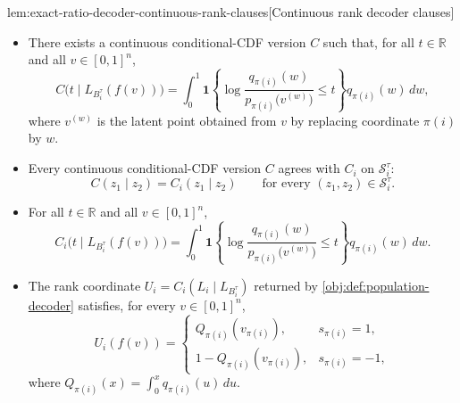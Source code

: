 \documentclass[11pt]{article}
\begin{document}
\begin{lemmav}{lem:exact-ratio-decoder-continuous-rank-clauses}[Continuous rank decoder clauses]
\begin{itemize}
\item There exists a continuous conditional-CDF version \(C\) such that, for all \(t\in\mathbb R\) and all \(v\in[0,1]^n\),
\[
C\bigl(t\mid L_{B_i^\tau}(f(v))\bigr)
=
\int_0^1
\mathbf 1\!\left\{\log\frac{q_{\pi(i)}(w)}
{p_{\pi(i)}\bigl(v^{(w)}\bigr)}\le t\right\}
q_{\pi(i)}(w)\,dw,
\]
where \(v^{(w)}\) is the latent point obtained from \(v\) by replacing coordinate \(\pi(i)\) by \(w\).
\item Every continuous conditional-CDF version \(C\) agrees with \(C_i\) on \(\mathcal S_i^\tau\):
\[
C(z_1\mid z_2)=C_i(z_1\mid z_2)
\qquad\text{for every }(z_1,z_2)\in\mathcal S_i^\tau.
\]
\item For all \(t\in\mathbb R\) and all \(v\in[0,1]^n\),
\[
C_i\bigl(t\mid L_{B_i^\tau}(f(v))\bigr)
=
\int_0^1
\mathbf 1\!\left\{\log\frac{q_{\pi(i)}(w)}
{p_{\pi(i)}\bigl(v^{(w)}\bigr)}\le t\right\}
q_{\pi(i)}(w)\,dw.
\]
\item The rank coordinate \(U_i=C_i(L_i\mid L_{B_i^\tau})\) returned by \cref{obj:def:population-decoder} satisfies, for every \(v\in[0,1]^n\),
\[
U_i(f(v))
=
\begin{cases}
Q_{\pi(i)}(v_{\pi(i)}), & s_{\pi(i)}=1,\\
1-Q_{\pi(i)}(v_{\pi(i)}), & s_{\pi(i)}=-1,
\end{cases}
\]
where \(Q_{\pi(i)}(x)=\int_0^x q_{\pi(i)}(u)\,du\).
\end{itemize}
\end{lemmav}
\end{document}
